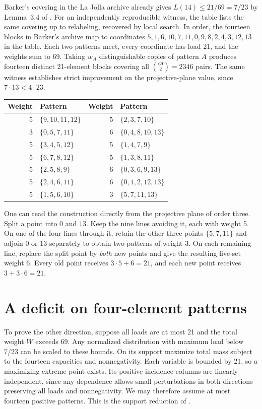 \documentclass[11pt]{article}
\begin{document}
Barker's covering in the La Jolla archive \cite{barker} already gives
\(L(14)\le21/69=7/23\) by Lemma~3.4 of \cite{hhs}. For an independently
reproducible witness, the table lists the same covering up to relabeling,
recovered by local search. In order, the fourteen blocks in Barker's
archive map to coordinates \(5,1,6,10,7,11,0,9,8,2,4,3,12,13\) in the table.
Each two patterns meet, every coordinate has load 21, and the
weights sum to 69. Taking \(w_A\) distinguishable copies of pattern \(A\)
produces fourteen distinct 21-element blocks covering all
\(\binom{69}{2}=2346\) pairs. The same witness establishes strict
improvement on the projective-plane value, since \(7\cdot13<4\cdot23\).

\begin{center}\small
\begin{tabular}{rl@{\qquad}rl}
Weight & Pattern & Weight & Pattern\\ \hline
5 & \(\{9,10,11,12\}\) & 5 & \(\{2,3,7,10\}\)\\
3 & \(\{0,5,7,11\}\) & 6 & \(\{0,4,8,10,13\}\)\\
5 & \(\{3,4,5,12\}\) & 5 & \(\{1,4,7,9\}\)\\
5 & \(\{6,7,8,12\}\) & 5 & \(\{1,3,8,11\}\)\\
5 & \(\{2,5,8,9\}\) & 6 & \(\{0,3,6,9,13\}\)\\
5 & \(\{2,4,6,11\}\) & 6 & \(\{0,1,2,12,13\}\)\\
5 & \(\{1,5,6,10\}\) & 3 & \(\{5,7,11,13\}\)
\end{tabular}
\end{center}

One can read the construction directly from the projective plane of
order three. Split a point into \(0\) and \(13\). Keep the nine lines
avoiding it, each with weight 5. On one of the four lines through it,
retain the other three points \(\{5,7,11\}\) and adjoin \(0\) or \(13\)
separately to obtain two patterns of weight 3. On each remaining line,
replace the split point by \emph{both} new points and give the resulting
five-set weight 6. Every old point receives \(3\cdot5+6=21\), and each
new point receives \(3+3\cdot6=21\).

\section{A deficit on four-element patterns}
To prove the other direction, suppose all loads are at most 21 and the
total weight \(W\) exceeds 69. Any normalized distribution with maximum
load below \(7/23\) can be scaled to these bounds. On its support maximize
total mass subject to the fourteen capacities and nonnegativity. Each
variable is bounded by 21, so a maximizing extreme point exists. Its
positive incidence columns are linearly independent, since any dependence
allows small perturbations in both directions preserving all loads and
nonnegativity. We may therefore assume at most fourteen positive
patterns. This is the support reduction of \cite[Lemma 3.2]{hhs}.
\end{document}
